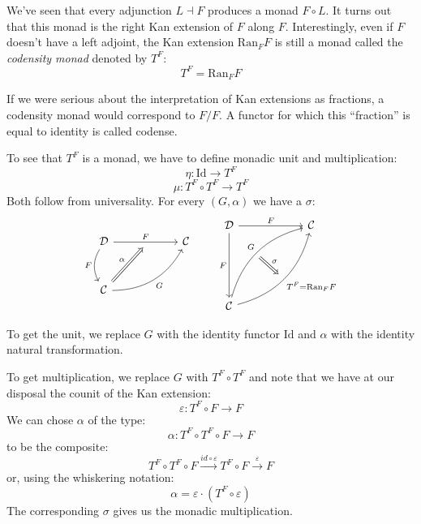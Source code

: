 \documentclass[DaoFP]{subfiles}
\begin{document}
 We've seen that every adjunction $L \dashv F$ produces a monad $F \circ L$. It turns out that this monad is the right Kan extension of $F$ along $F$. Interestingly, even if $F$ doesn't have a left adjoint, the Kan extension $\text{Ran}_F F$ is still a monad called the \emph{codensity monad} denoted by $T^F$:
 \[ T^F = \text{Ran}_F F \]
 
If we were serious about the interpretation of Kan extensions as fractions, a codensity monad would correspond to $F/F$. A functor for which this ``fraction'' is equal to identity is called codense.

To see that $T^F$ is a monad, we have to define monadic unit and multiplication:
\[ \eta \colon \text{Id} \to T^F \]
\[ \mu \colon T^F \circ T^F \to  T^F \]
 Both follow from universality. For every $(G, \alpha)$ we have a $\sigma$:
\[
 \begin{tikzcd} [row sep=1cm, column sep=1cm]
 \cat D
 \arrow[rr, "F", "" {name=ID, below} ]
 \arrow[d, bend right, "F"']
 && \cat C
 \\
 \cat C
  \arrow[urr, bend right, "G"']
 \arrow[Rightarrow, "\alpha",  to=ID]
 \end{tikzcd}
 \qquad
\begin{tikzcd}[row sep=2cm, column sep=2cm]
\cat D  \ar[d, "F"', "" {name=P}]
            \ar[r, "F", ""  {name=F, below, near start, bend right}]
&
\cat C
\\
\cat C
    \ar[ur, bend left, "G", "" {name=G, below}]
    \ar[ur, bend right, "T^F = \text{Ran}_F F"', "" {name=Ran}]
\arrow[Rightarrow, "\sigma", from=G, to=Ran]
\end{tikzcd}
\]

To get the unit, we replace $G$ with the identity functor $\text{Id}$ and $\alpha$ with the identity natural transformation. 

To get multiplication, we replace $G$ with $T^F \circ T^F$ and note that we have at our disposal the counit of the Kan extension:
\[ \varepsilon \colon  T^F \circ F \to F \]
We can chose $\alpha$ of the type:
\[ \alpha \colon T^F \circ T^F \circ F \to F \]
to be the composite:
\[ T^F \circ T^F \circ F \xrightarrow{id \circ \varepsilon} T^F \circ F \xrightarrow{\varepsilon} F\]
or, using the whiskering notation:
\[ \alpha = \varepsilon \cdot (T^F \circ \varepsilon) \]
The corresponding $\sigma$ gives us the monadic multiplication.
\end{document}

